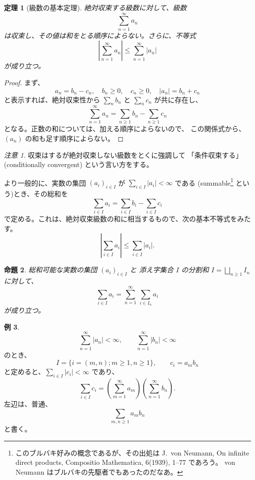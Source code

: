 \documentclass[a4paper]{jsarticle}
\newtheorem{Theorem}{定理}[section]
\newtheorem{Proposition}[Theorem]{命題}
\theoremstyle{definition}
\newtheorem{Example}[Theorem]{例}
\theoremstyle{remark}
\newtheorem{Remark}{注意}
\begin{document}
\begin{Theorem}[級数の基本定理]
絶対収束する級数に対して、級数
\[
\sum_{n=1}^\infty a_n 
\]
は収束し、その値は和をとる順序によらない。さらに、不等式
\[
\left| \sum_{n=1}^\infty a_n \right| \leq \sum_{n=1}^\infty |a_n| 
\]
が成り立つ。
\end{Theorem} 

\begin{proof}
まず、
\[
a_n = b_n - c_n,\quad
b_n \geq 0, \quad
c_n \geq 0, \quad
|a_n| = b_n + c_n
\]
と表示すれば、絶対収束性から
$\sum_n b_n$ と $\sum_n c_n$ が共に存在し、
\[
\sum_{n = 1}^\infty  a_n = \sum_{n \geq 1} b_n - \sum_{n \geq 1} c_n
\]
となる。正数の和については、加える順序によらないので、
この関係式から、$(a_n)$ の和も足す順序によらない。
\end{proof}

 {\small
\begin{Remark}
収束はするが絶対収束しない級数をとくに強調して
「条件収束する」(conditionally convergent) という言い方をする。
\end{Remark}}

より一般的に、実数の集団 $(a_i)_{i \in I}$ が
$\sum_{i \in I} |a_i| < \infty$ である (summable\footnote{
このブルバキ好みの概念であるが、その出処は
J.~von Neumann, On infinite direct products, Compositio Mathematica, 6(1939), 1--77   
であろう。 
von Neumann はブルバキの先駆者でもあったのだなあ。
} という)とき、その総和を
\[ 
\sum_{i \in I} a_i = \sum_{i \in I} b_i - \sum_{i \in I} c_i 
\]
で定める。これは、絶対収束級数の和に相当するもので、次の基本不等式をみたす。
\[
\left| \sum_{i \in I} a_i \right| 
\leq 
\sum_{i \in I} |a_i|. 
\]


\begin{Proposition}
総和可能な実数の集団 $(a_i)_{i \in I}$ と
添え字集合 $I$ の分割和 
$I = \displaystyle \bigsqcup_{n\geq 1} I_n$ に対して、
\[
\sum_{i \in I} a_i = \sum_{n=1}^\infty\, \sum_{i \in I_n} a_i
\]
が成り立つ。
\end{Proposition}

\begin{Example}
\[
\sum_{n=1}^\infty |a_n| < \infty, \qquad 
\sum_{n=1}^\infty |b_n| < \infty
\]
のとき、
\[
I = \{ i = (m,n); m \geq 1, n \geq 1\}, \qquad 
c_i = a_mb_n
\]
と定めると、$\displaystyle \sum_{i \in I} |c_i| < \infty$ 
であり、
\[
\sum_{i \in I} c_i = \left( \sum_{m=1}^\infty a_m \right)
\left( \sum_{n=1}^\infty b_n \right).
\]
左辺は、普通、
\[
\sum_{m,n \geq 1} a_mb_n 
\]
と書く。
\end{Example}
\end{document}
